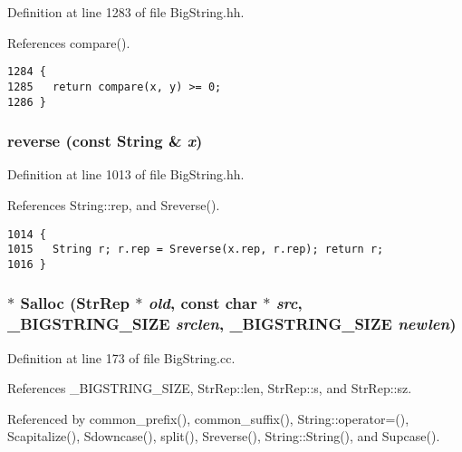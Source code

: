 Definition at line 1283 of file Big\-String.hh.

References compare().



\footnotesize\begin{verbatim}1284 {
1285   return compare(x, y) >= 0; 
1286 }
\end{verbatim}\normalsize 
{}
\subsubsection{ reverse (const {\bf String} \& {\em x})\hspace{0.3cm}{\tt  [inline]}}\label{BigString_8hh_a81}




Definition at line 1013 of file Big\-String.hh.

References String::rep, and Sreverse().



\footnotesize\begin{verbatim}1014 {
1015   String r; r.rep = Sreverse(x.rep, r.rep); return r;
1016 }
\end{verbatim}\normalsize 
{}
\subsubsection{$\ast$ Salloc ({\bf Str\-Rep} $\ast$ {\em old}, const char $\ast$ {\em src}, {\bf \_\-BIGSTRING\_\-SIZE} {\em srclen}, {\bf \_\-BIGSTRING\_\-SIZE} {\em newlen})}\label{BigString_8hh_a16}




Definition at line 173 of file Big\-String.cc.

References \_\-BIGSTRING\_\-SIZE, Str\-Rep::len, Str\-Rep::s, and Str\-Rep::sz.

Referenced by common\_\-prefix(), common\_\-suffix(), String::operator=(), Scapitalize(), Sdowncase(), split(), Sreverse(), String::String(), and Supcase().




